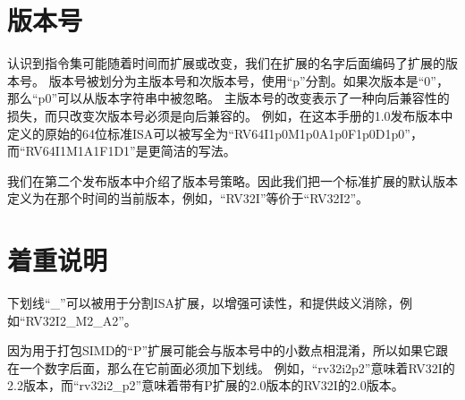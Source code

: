 \section{版本号}
认识到指令集可能随着时间而扩展或改变，我们在扩展的名字后面编码了扩展的版本号。
版本号被划分为主版本号和次版本号，使用“p”分割。如果次版本是“0”，那么“p0”可以从版本字符串中被忽略。
主版本号的改变表示了一种向后兼容性的损失，而只改变次版本号必须是向后兼容的。
例如，在这本手册的1.0发布版本中定义的原始的64位标准ISA可以被写全为“RV64I1p0M1p0A1p0F1p0D1p0”，
而“RV64I1M1A1F1D1”是更简洁的写法。

我们在第二个发布版本中介绍了版本号策略。因此我们把一个标准扩展的默认版本定义为在那个时间的当前版本，例如，“RV32I”等价于“RV32I2”。

\section{着重说明}

下划线“_”可以被用于分割ISA扩展，以增强可读性，和提供歧义消除，例如“RV32I2_M2_A2”。

因为用于打包SIMD的“P”扩展可能会与版本号中的小数点相混淆，所以如果它跟在一个数字后面，那么在它前面必须加下划线。
例如，“rv32i2p2”意味着RV32I的2.2版本，而“rv32i2_p2”意味着带有P扩展的2.0版本的RV32I的2.0版本。

